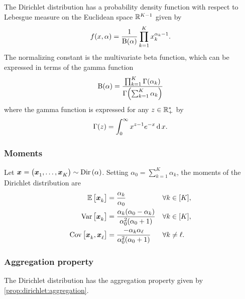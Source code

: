 The Dirichlet distribution has a probability density function with respect to Lebesgue measure on the Euclidean space $\mathbb{R}^{K-1}$ given by
\begin{equation}\label{eq:dirchlet:probability-density-function}
  f\bracket{x,\alpha} = \frac{1}{ \Beta\bracket{\alpha}}\prod_{k=1}^K x_k^{\alpha_k-1}.
\end{equation}
The normalizing constant is the multivariate beta function, which can be expressed in terms of the gamma function
\begin{equation}
  \Beta\bracket{\alpha} =
  \frac{ \prod_{k=1}^K \Gamma\bracket{\alpha_k} }
       { \Gamma\bracket{\sum_{k=1}^K \alpha_k} }
\end{equation}
where the gamma function is expressed for any $z\in\mathbb{R}_+^*$ by
\begin{equation}
  \Gamma\bracket{z} = \int_0^{\infty} x^{z-1}e^{-x} \diff x.
\end{equation}


\subsubsection{Moments}


Let $\va x=\bracket{\va x_1,\ldots,\va x_K}\sim \Dir\bracket{\alpha}$.
Setting $\alpha_0=\sum_{k=1}^K\alpha_k$, the moments of the Dirichlet distribution are
\begin{subequations}\label{eq:dirchlet:moments}
  \begin{align}
    \espe\sqbracket{\va x_k} &= \frac{\alpha_k}{\alpha_0} && \forall k\in\range{K},
    \label{eq:dirchlet:moments:mean}
    \\
    \vari\sqbracket{\va x_k} &= \frac{\alpha_k\bracket{\alpha_0-\alpha_k}}{\alpha_0^2\bracket{\alpha_0+1}} && \forall k\in\range{K},
    \label{eq:dirchlet:moments:variance}
    \\
    \cova\sqbracket{\va x_k,\va x_{\ell}} &= \frac{-\alpha_k\alpha_{\ell}}{\alpha_0^2\bracket{\alpha_0+1}} && \forall k\ne\ell.
    \label{eq:dirchlet:moments:covariance}
  \end{align}
\end{subequations}


\subsubsection{Aggregation property}


The Dirichlet distribution has the aggregation property given by \cref{prop:dirichlet:aggregation}.

